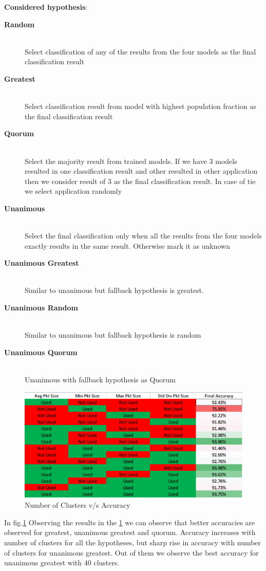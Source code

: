 \documentclass[conference]{IEEEtran}
\begin{document}
\textbf{Considered hypothesis}:
\begin{description}
	\item[\textbf{Random}]\hfill \\ Select classification of any of the results from the four models as the final classification result
	\item[\textbf{Greatest}]\hfill \\ Select classification result from model with highest population fraction as the final classification result
	\item[\textbf{Quorum}]\hfill \\ Select the majority result from trained models. If we have 3 models resulted in one classification result and other resulted in other application then we consider result of 3 as the final classification result. In case of tie we select application randomly
	\item[\textbf{Unanimous}]\hfill \\ Select the final classification only when all the results from the four models exactly results in the same result. Otherwise mark it as unknown
	\item[\textbf{Unanimous Greatest}]\hfill \\ Similar to unanimous but fallback hypothesis is greatest.
	\item[\textbf{Unanimous Random}]\hfill \\ Similar to unanimous but fallback hypothesis is random
	\item[\textbf{Unanimous Quorum}]\hfill \\ Unanimous with fallback hypothesis as Quorum
\end{description}
\begin{figure}[!t]
	\centering
	\includegraphics[width=7.16in]{pkt_size}
	\caption{Number of Clusters v/s Accuracy}
	\label{fig_hypo_models}
\end{figure}
In fig.\ref{fig_hypo_models} Observing the results in the \ref{fig_hypo_models} we can observe that better accuracies are observed for greatest, unanimous greatest and quorum. Accuracy increases with number of clusters for all the hypotheses, but sharp rise in accuracy with number of clusters for unanimous greatest. Out of them we observe the best accuracy for unanimous greatest with 40 clusters.
\end{document}
